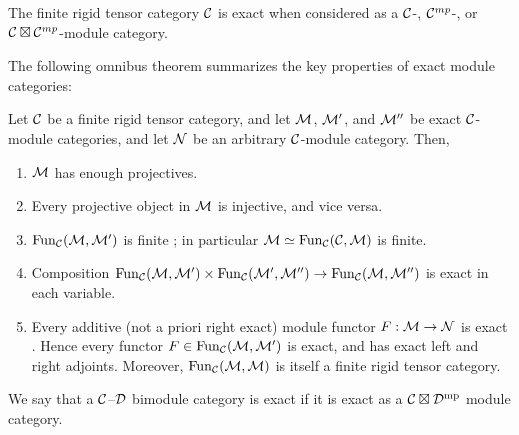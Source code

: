 \documentclass{amsart}
\begin{document}
\begin{example} \label{ex:exactness}
	The finite rigid tensor category $\mathcal C$ is exact when considered as a $\mathcal C$-, $\mathcal C^{mp}$-, or $\mathcal C \boxtimes \mathcal C^{mp}$-module category. 
\end{example}


The following omnibus theorem summarizes the key properties of exact module categories: 
\begin{theorem} \label{Thm:ExactModCatOmnibus}
	Let $\mathcal C$ be a finite rigid tensor category, and let $\mathcal M$, $\mathcal M'$, and $\mathcal M''$ be exact $\mathcal C$-module categories, and let $\mathcal N$ be an arbitrary $\mathcal C$-module category. Then,
	\begin{enumerate}
		\item $\mathcal M$ has enough projectives. \cite[Lemma 2.7.1]{EGNO}
		\item Every projective object in $\mathcal M$  is injective, and vice versa. \cite[Cor 2.7.4]{EGNO}
		\item $\operatorname{Fun}_{\mathcal C}(\mathcal M, \mathcal M')$ is finite \cite[Prop 2.13.5]{EGNO}; in particular $\mathcal M \simeq \operatorname{Fun}_{\mathcal C}(\mathcal C, \mathcal M)$ is finite.
		\item Composition $\operatorname{Fun}_{\mathcal C}(\mathcal M, \mathcal M') \times \operatorname{Fun}_{\mathcal C}(\mathcal M', \mathcal M'') \to \operatorname{Fun}_{\mathcal C}(\mathcal M, \mathcal M'')$ is exact in each variable. \cite[Lemma 2.13.2]{EGNO}		
		\item Every additive (not a priori right exact) module functor $F:\mathcal M \to \mathcal N$ is exact \cite[Prop 2.7.8]{EGNO}. Hence every functor $F \in \operatorname{Fun}_{\mathcal C}(\mathcal M, \mathcal M')$ is exact, and has exact left and right adjoints. Moreover, $\operatorname{Fun}_{\mathcal C}(\mathcal M,\mathcal M)$ is itself a finite rigid tensor category. 
	\end{enumerate}
\end{theorem}

\begin{definition}
We say that a $\mathcal C$--$\mathcal D$ bimodule category is exact if it is exact as a $\mathcal C \boxtimes \mathcal D^{\mathrm{mp}}$ module category.
\end{definition}
\end{document}
